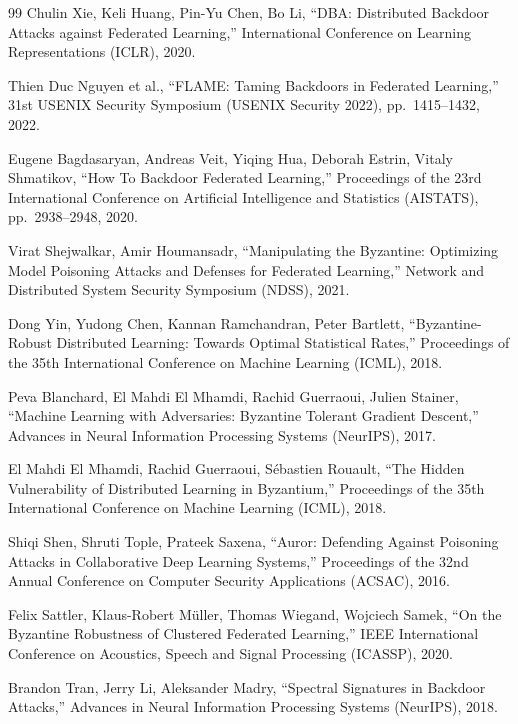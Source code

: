 \documentclass[a4j, twocolumn, dvipdfmx]{jsarticle}
\begin{document}
\begin{thebibliography}{99}
Chulin Xie, Keli Huang, Pin-Yu Chen, Bo Li,
``DBA: Distributed Backdoor Attacks against Federated Learning,''
International Conference on Learning Representations (ICLR), 2020.

Thien Duc Nguyen et al.,
``FLAME: Taming Backdoors in Federated Learning,''
31st USENIX Security Symposium (USENIX Security 2022), pp.~1415--1432, 2022.

Eugene Bagdasaryan, Andreas Veit, Yiqing Hua, Deborah Estrin, Vitaly Shmatikov,
``How To Backdoor Federated Learning,''
Proceedings of the 23rd International Conference on Artificial Intelligence and Statistics (AISTATS),
pp.~2938--2948, 2020.

Virat Shejwalkar, Amir Houmansadr,
``Manipulating the Byzantine: Optimizing Model Poisoning Attacks and Defenses for Federated Learning,''
Network and Distributed System Security Symposium (NDSS), 2021.

Dong Yin, Yudong Chen, Kannan Ramchandran, Peter Bartlett,
``Byzantine-Robust Distributed Learning: Towards Optimal Statistical Rates,''
Proceedings of the 35th International Conference on Machine Learning (ICML), 2018.

Peva Blanchard, El Mahdi El Mhamdi, Rachid Guerraoui, Julien Stainer,
``Machine Learning with Adversaries: Byzantine Tolerant Gradient Descent,''
Advances in Neural Information Processing Systems (NeurIPS), 2017.

El Mahdi El Mhamdi, Rachid Guerraoui, S\'ebastien Rouault,
``The Hidden Vulnerability of Distributed Learning in Byzantium,''
Proceedings of the 35th International Conference on Machine Learning (ICML), 2018.

Shiqi Shen, Shruti Tople, Prateek Saxena,
``Auror: Defending Against Poisoning Attacks in Collaborative Deep Learning Systems,''
Proceedings of the 32nd Annual Conference on Computer Security Applications (ACSAC), 2016.

Felix Sattler, Klaus-Robert M\"uller, Thomas Wiegand, Wojciech Samek,
``On the Byzantine Robustness of Clustered Federated Learning,''
IEEE International Conference on Acoustics, Speech and Signal Processing (ICASSP), 2020.

Brandon Tran, Jerry Li, Aleksander Madry,
``Spectral Signatures in Backdoor Attacks,''
Advances in Neural Information Processing Systems (NeurIPS), 2018.


\end{thebibliography}
\end{document}
